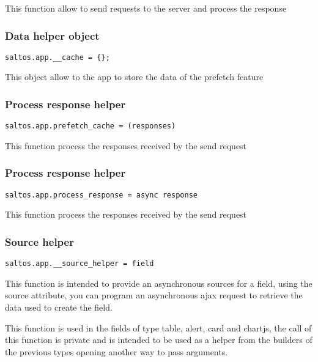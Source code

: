 \documentclass[a4paper]{article}
\begin{document}
This function allow to send requests to the server and process the response

\hypertarget{toc567}{}
\subsubsection{Data helper object}

\begin{lstlisting}
saltos.app.__cache = {};
\end{lstlisting}

This object allow to the app to store the data of the prefetch feature

\hypertarget{toc568}{}
\subsubsection{Process response helper}

\begin{lstlisting}
saltos.app.prefetch_cache = (responses)
\end{lstlisting}

This function process the responses received by the send request

\hypertarget{toc569}{}
\subsubsection{Process response helper}

\begin{lstlisting}
saltos.app.process_response = async response
\end{lstlisting}

This function process the responses received by the send request

\hypertarget{toc570}{}
\subsubsection{Source helper}

\begin{lstlisting}
saltos.app.__source_helper = field
\end{lstlisting}

This function is intended to provide an asynchronous sources for a field, using the source attribute,
you can program an asynchronous ajax request to retrieve the data used to create the field.

This function is used in the fields of type table, alert, card and chartjs, the call of this function
is private and is intended to be used as a helper from the builders of the previous types opening
another way to pass arguments.
\end{document}
